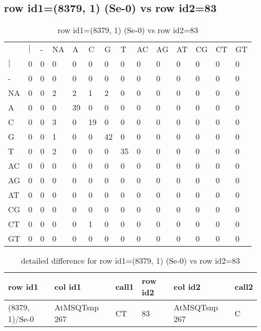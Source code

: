 \subsection{row id1=(8379, 1) (Se-0) vs row id2=83}
\begin{center}
\begin{longtable}{|l|l|l|l|l|l|l|l|l|l|l|l|l|l|}
\caption{row id1=(8379, 1) (Se-0) vs row id2=83} \label{table_dm418}\\
\hline
\\
\hline
&$|$&-&NA&A&C&G&T&AC&AG&AT&CG&CT&GT\\
$|$&0&0&0&0&0&0&0&0&0&0&0&0&0\\
-&0&0&0&0&0&0&0&0&0&0&0&0&0\\
NA&0&0&2&2&1&2&0&0&0&0&0&0&0\\
A&0&0&0&39&0&0&0&0&0&0&0&0&0\\
C&0&0&3&0&19&0&0&0&0&0&0&0&0\\
G&0&0&1&0&0&42&0&0&0&0&0&0&0\\
T&0&0&2&0&0&0&35&0&0&0&0&0&0\\
AC&0&0&0&0&0&0&0&0&0&0&0&0&0\\
AG&0&0&0&0&0&0&0&0&0&0&0&0&0\\
AT&0&0&0&0&0&0&0&0&0&0&0&0&0\\
CG&0&0&0&0&0&0&0&0&0&0&0&0&0\\
CT&0&0&0&0&1&0&0&0&0&0&0&0&0\\
GT&0&0&0&0&0&0&0&0&0&0&0&0&0\\
\hline
\end{longtable}
\end{center}

\begin{center}
\begin{longtable}{|l|l|l|l|l|l|}
\caption{detailed difference for row id1=(8379, 1) (Se-0) vs row id2=83} \label{table_dm419}\\
\hline
row id1&col id1&call1&row id2&col id2&call2\\
\hline
(8379, 1)/Se-0&AtMSQTsnp 267&CT&83&AtMSQTsnp 267&C\\
\hline
\end{longtable}
\end{center}

